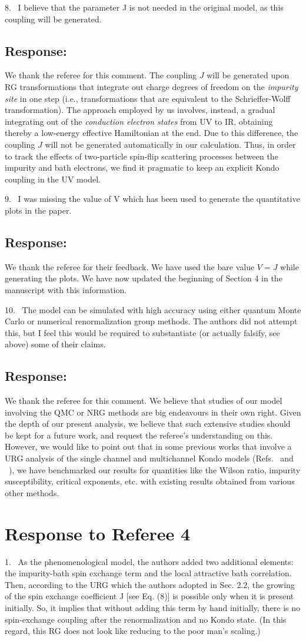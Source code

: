 \documentclass{article}
\newcommand{\response}[1]{{\color{blue}\subsection*{Response:}{#1}\vspace*{10pt}}}
\begin{document}
8.~
I believe that the parameter J is not needed in the original model, as this coupling will be generated.

\response{
	We thank the referee for this comment. The coupling \(J\) will be generated upon RG transformations that integrate out charge degrees of freedom on the {\it impurity site} in one step (i.e., transformations that are equivalent to the Schrieffer-Wolff transformation). The approach employed by us involves, instead, a gradual integrating out of the {\it conduction electron states} from UV to IR, obtaining thereby a low-energy effective Hamiltonian at the end. Due to this difference, the coupling \(J\) will not be generated automatically in our calculation. Thus, in order to track the effects of two-particle spin-flip scattering processes between the impurity and bath electrons, we find it pragmatic to keep an explicit Kondo coupling in the UV model.
}

9.~
I was missing the value of V which has been used to generate the quantitative plots in the paper.

\response{
We thank the referee for their feedback. We have used the bare value \(V=J\) while generating the plots. We have now updated the beginning of Section 4 in the manuscript with this information.
}

10.~
The model can be simulated with high accuracy using either quantum Monte Carlo or numerical renormalization group methods. The authors did not attempt this, but I feel this would be required to substantiate (or actually falsify, see above) some of their claims.

\response{
We thank the referee for this comment. We believe that studies of our model involving the QMC or NRG methods are big endeavours in their own right. Given the depth of our present analysis, we believe that such extensive studies should be kept for a future work, and request the referee's understanding on this. However, we would like to point out that in some previous works that involve a URG analysis of the single channel and multichannel Kondo models (Refs.~\cite{anirban_kondo} and ~\cite{Patra_2023}), we have benchmarked our results for quantities like the Wilson ratio, impurity susceptibility, critical exponents, etc. with existing results obtained from various other methods.
}

\section*{Response to Referee 4}
1.~
As the phenomenological model, the authors added two additional elements: the impurity-bath spin exchange term and the local attractive bath correlation. Then, according to the URG which the authors adopted in Sec. 2.2, the growing of the spin exchange coefficient J [see Eq. (8)] is possible only when it is present initially. So, it implies that without adding this term by hand initially, there is no spin-exchange coupling after the renormalization and no Kondo state. (In this regard, this RG does not look like reducing to the poor man’s scaling.)
\end{document}
